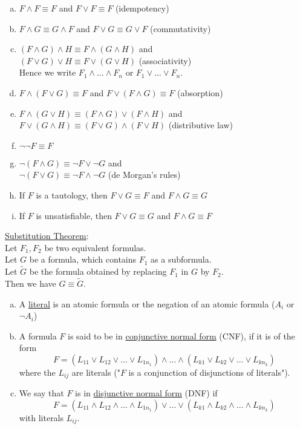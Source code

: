 \documentclass[a4paper]{article}
\newcommand{\ul}{\underline}
\begin{document}
\begin{enumerate}[(a)]
	\item $F\wedge F\equiv F$ and $F\vee F\equiv F$ (idempotency)
	\item $F\wedge G\equiv G\wedge F$ and $F\vee G\equiv G\vee F$ (commutativity)
	\item $(F\wedge G)\wedge H\equiv F\wedge(G\wedge H)$ and\\
	$(F\vee G)\vee H\equiv F\vee (G\vee H)$ (associativity)\\
	Hence we write $F_1\wedge\dots\wedge F_n$ or $F_1\vee \dots\vee F_n$.
	\item $F\wedge(F\vee G)\equiv F$ and $F\vee(F\wedge G)\equiv F$ (absorption)
	\item $F\wedge(G\vee H)\equiv (F\wedge G)\vee(F\wedge H)$ and\\
	$F\vee(G\wedge H)\equiv (F\vee G)\wedge(F\vee H)$ (distributive law)
	\item $\neg$$\neg F\equiv F$
	\item $\neg(F\wedge G)\equiv \neg F\vee \neg G$ and\\
	$\neg(F\vee G)\equiv \neg F\wedge \neg G$ (de Morgan's rules)
	\item If $F$ is a tautology, then $F\vee G\equiv F$ and $F\wedge G\equiv G$
	\item If $F$ is unsatisfiable, then $F\vee G\equiv G$ and $F\wedge G\equiv F$
\end{enumerate}
\ul{Substitution Theorem}:\\
Let $F_1,F_2$ be two equivalent formulas.\\
Let $G$ be a formula, which contains $F_1$ as a subformula.\\
Let $\tilde{G}$ be the formula obtained by replacing $F_1$ in $G$ by $F_2$.\\
Then we have $G\equiv \tilde{G}$.
\begin{enumerate}[(a)]
	\item A \ul{literal} is an atomic formula or the negation of an atomic formula ($A_i$ or $\neg A_i$)
	\item A formula $F$ is said to be in \ul{conjunctive normal form} (CNF), if it is of the form $$F=(L_{11}\vee L_{12}\vee\dots\vee L_{1n_1})\wedge\dots\wedge(L_{k1}\vee L_{k2}\vee\dots\vee L_{kn_k})$$ where the $L_{ij}$ are literals ("$F$ is a conjunction of disjunctions of literals").
	\item We say that $F$ is in \ul{disjunctive normal form} (DNF) if $$F=(L_{11}\wedge L_{12}\wedge\dots\wedge L_{1n_1})\vee\dots\vee(L_{k1}\wedge L_{k2}\wedge\dots\wedge L_{kn_k})$$ with literals $L_{ij}$.
\end{enumerate}
\end{document}
